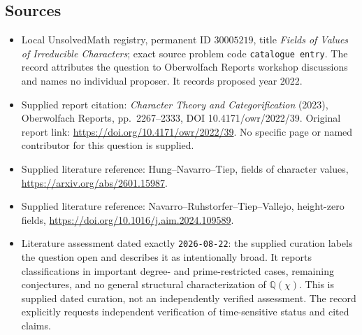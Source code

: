 \documentclass[11pt]{article}
\begin{document}
\subsection{Sources}
\begin{itemize}
\item Local UnsolvedMath registry, permanent ID \(30005219\), title \emph{Fields of Values of Irreducible Characters}; exact source problem code \texttt{catalogue entry}. The record attributes the question to Oberwolfach Reports workshop discussions and names no individual proposer. It records proposed year 2022.
\item Supplied report citation: \emph{Character Theory and Categorification} (2023), Oberwolfach Reports, pp.\ 2267--2333, DOI 10.4171/owr/2022/39. Original report link: \url{https://doi.org/10.4171/owr/2022/39}. No specific page or named contributor for this question is supplied.
\item Supplied literature reference: Hung--Navarro--Tiep, fields of character values, \url{https://arxiv.org/abs/2601.15987}.
\item Supplied literature reference: Navarro--Ruhstorfer--Tiep--Vallejo, height-zero fields, \url{https://doi.org/10.1016/j.aim.2024.109589}.
\item Literature assessment dated exactly \texttt{2026-08-22}: the supplied curation labels the question open and describes it as intentionally broad. It reports classifications in important degree- and prime-restricted cases, remaining conjectures, and no general structural characterization of \(\mathbb{Q}(\chi)\). This is supplied dated curation, not an independently verified assessment. The record explicitly requests independent verification of time-sensitive status and cited claims.
\end{itemize}
\end{document}
